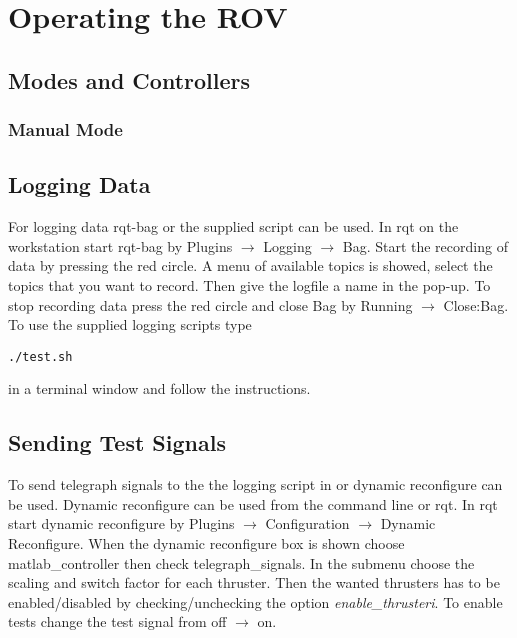 \section{Operating the ROV}

\subsection{Modes and Controllers}

\subsubsection{Manual Mode}

\subsection{Logging Data}\label{sec:logging}
For logging data rqt-bag or the supplied script can be used. In rqt on the workstation start rqt-bag by Plugins $\rightarrow$ Logging $\rightarrow$ Bag. Start the recording of data by pressing the red circle. A menu of available topics is showed, select the topics that you want to record. Then give the logfile a name in the pop-up.
To stop recording data press the red circle and close Bag by Running $\rightarrow$ Close:Bag. To use the supplied logging scripts type 
\begin{lstlisting}
./test.sh
\end{lstlisting}
in a terminal window and follow the instructions.

\subsection{Sending Test Signals}
To send telegraph signals to the \abbrROV the logging script in  or dynamic reconfigure can be used. Dynamic reconfigure can be used from the command line or rqt. In rqt start dynamic reconfigure by Plugins $\rightarrow$ Configuration $\rightarrow$ Dynamic Reconfigure. When the dynamic reconfigure box is shown choose matlab\_controller then check telegraph\_signals. In the submenu choose the scaling and switch factor for each thruster. Then the wanted thrusters has to be enabled/disabled by checking/unchecking the option \textit{enable\_thrusteri}. To enable tests change the test signal from off $\rightarrow$ on.    

